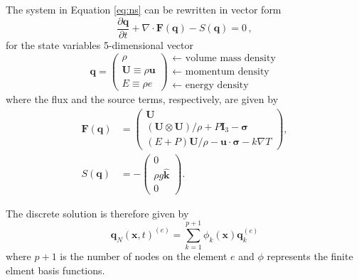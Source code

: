 The system in Equation \ref{eq:ns} can be rewritten in vector form
\begin{equation}
   \frac{\partial \mathbf{q}}{\partial t} + \nabla \cdot \mathbf{F}(\mathbf{q}) -S(\mathbf{q}) = 0 \, ,
\label{eq:vector-ns}
\end{equation}
for the state variables 5-dimensional vector
\begin{equation}
    \mathbf{q} =
           \begin{pmatrix}
               \rho \\
               \mathbf{U} \equiv \rho \mathbf{u}\\
               E \equiv \rho e
           \end{pmatrix}
           \begin{array}{l}
               \leftarrow\textrm{ volume mass density}\\
               \leftarrow\textrm{ momentum density}\\
               \leftarrow\textrm{ energy density}
           \end{array}
\end{equation}
where the flux and the source terms, respectively, are given by
\begin{equation}
    \begin{aligned}
    \mathbf{F}(\mathbf{q}) &=
    \begin{pmatrix}
        \mathbf{U}\\
        {(\mathbf{U} \otimes \mathbf{U})}/{\rho} + P \mathbf{I}_3 -  \boldsymbol{\sigma} \\
        {(E + P)\mathbf{U}}/{\rho} - \mathbf{u}  \cdot \boldsymbol{\sigma} - k \nabla T
    \end{pmatrix} ,\\
    S(\mathbf{q}) &=
    - \begin{pmatrix}
        0\\
        \rho g \mathbf{\hat{k}}\\
        0
    \end{pmatrix}.
    \end{aligned}
\end{equation}

The discrete solution is therefore given by
\begin{equation}
   \mathbf{q}_N (\mathbf{x},t)^{(e)} = \sum_{k = 1}^{p + 1}\phi_k (\mathbf{x})\mathbf{q}_k^{(e)}
\end{equation}
where $p + 1$ is the number of nodes on the element $e$ and $\phi$ represents the finite elment basis functions.

